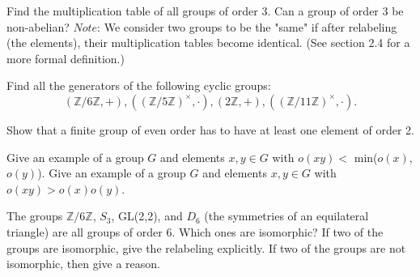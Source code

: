 \documentclass[12pt,letterpaper,boxed]{hmcpset}
\begin{document}

\begin{problem}[2.2.5]
Find the multiplication table of all groups of order 3. Can a group of order 3 be non-abelian?
$ \textit{Note} $: We consider two groups to be the "same" if after relabeling (the elements), their multiplication tables become identical. (See section 2.4 for a more formal definition.)
\end{problem}

\begin{solution}

\end{solution}

\clearpage

\begin{problem}[2.3.6]
Find all the generators of the following cyclic groups: $$ (\mathbb{Z}/6\mathbb{Z}, +), ( \left(\mathbb{Z}/5\mathbb{Z}\right)^{\times},\cdot ), (2\mathbb{Z},+),((\mathbb{Z}/11\mathbb{Z})^{\times},\cdot).$$
\end{problem}

\begin{solution}
\end{solution}

\clearpage

\begin{problem}[2.3.7]
Show that a finite group of even order has to have at least one element of order 2. 
\end{problem}

\begin{solution}
\end{solution}

\clearpage


\begin{problem}[2.3.15]
Give an example of a group $G$ and elements $ x,y \in G $ with $ o(xy) < $ min($o(x)$, $o(y)$). Give an example of a group $G$ and elements $ x,y \in G $ with $o(xy) > o(x)o(y)$.
\end{problem}

\begin{solution}
\end{solution}

\clearpage

\begin{problem}[2.4.1]
The groups $\mathbb{Z}/6\mathbb{Z}$, $S_3$, GL(2,2), and $D_6$ (the symmetries of an equilateral triangle) are all groups of order 6. Which ones are isomorphic? If two of the groups are isomorphic, give the relabeling explicitly. If two of the groups are not isomorphic, then give a reason. 
\end{problem}

\begin{solution}

\end{solution}
\end{document}
